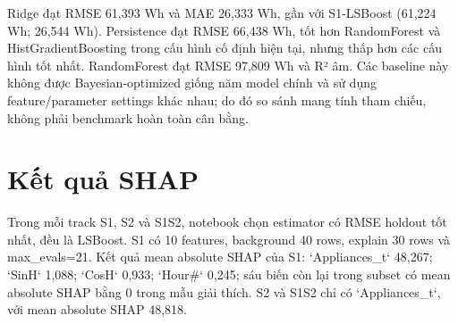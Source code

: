 Ridge đạt RMSE 61,393 Wh và MAE 26,333 Wh, gần với S1-LSBoost (61,224 Wh; 26,544 Wh). Persistence đạt RMSE 66,438 Wh, tốt hơn RandomForest và HistGradient\allowbreak Boosting trong cấu hình cố định hiện tại, nhưng thấp hơn các cấu hình tốt nhất. RandomForest đạt RMSE 97,809 Wh và R² âm. Các baseline này không được Bayesian-optimized giống năm model chính và sử dụng feature/parameter settings khác nhau; do đó so sánh mang tính tham chiếu, không phải benchmark hoàn toàn cân bằng.

\section{Kết quả SHAP}\label{kux1ebft-quux1ea3-shap}

Trong mỗi track S1, S2 và S1S2, notebook chọn estimator có RMSE holdout tốt nhất, đều là LSBoost. S1 có 10 features, background 40 rows, explain 30 rows và max\_evals=21. Kết quả mean absolute SHAP của S1: `Appliances\_t` 48,267; `SinH` 1,088; `CosH` 0,933; `Hour\#` 0,245; sáu biến còn lại trong subset có mean absolute SHAP bằng 0 trong mẫu giải thích. S2 và S1S2 chỉ có `Appliances\_t`, với mean absolute SHAP 48,818.

